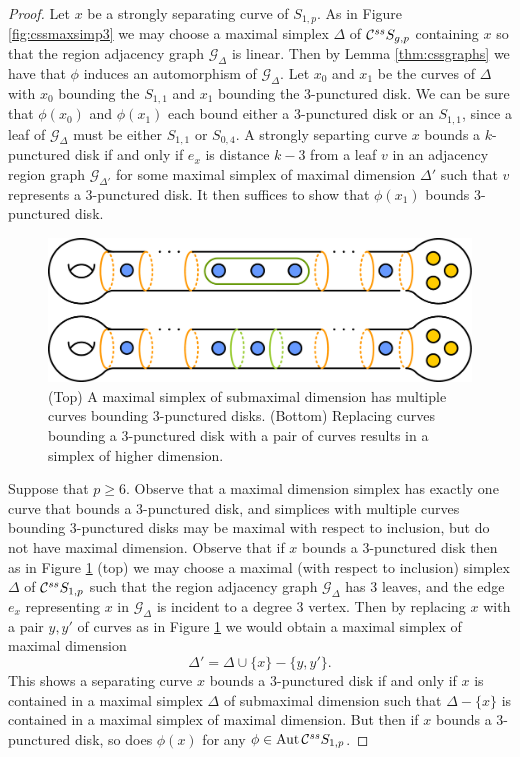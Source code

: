 \begin{proof}
    Let $x$ be a strongly separating curve of $S_{1,p}$.
    As in Figure \ref{fig:cssmaxsimp3} we may choose a maximal simplex $\Delta$ of $ \mathcal C^{{ss}}  S_{g,p}$
    containing $x$ so that the region adjacency graph $\mathcal G_\Delta$ is linear.
    Then by Lemma \ref{thm:cssgraphs} we have that $\phi$ induces an automorphism of $\mathcal G_\Delta$.
    Let $x_0$ and $x_1$ be the curves of $\Delta$ with $x_0$ bounding the $S_{1,1}$ and
    $x_1$ bounding the 3-punctured disk. We can be sure that $\phi(x_0)$ and $\phi(x_1)$ each
    bound either a 3-punctured disk or an $S_{1,1}$, since a leaf of $\mathcal G_\Delta$ must be either $S_{1,1}$ or $S_{0,4}$.
    A strongly separting curve  $x$ bounds a $k$-punctured disk if and only if $e_x$ is distance $k-3$ from a leaf $v$ in an adjacency region graph $\mathcal G_{\Delta'}$ for some maximal simplex of maximal dimension $\Delta'$ such that $v$ represents a 3-punctured disk.
    It then suffices to show that $\phi(x_1)$ bounds 3-punctured disk.

    \begin{figure}[h!]
      \centering
      \includegraphics[width=.6\textwidth]{figures/cssmaxsimp5.pdf}
      \caption{(Top) A maximal simplex of submaximal dimension has multiple curves bounding 3-punctured disks.
      (Bottom) Replacing curves bounding a 3-punctured disk with a pair of curves results in a simplex of higher dimension.}
      \label{fig:cssmaxsimp5}
    \end{figure}

    Suppose that $p\geq 6$. Observe that a maximal dimension simplex has exactly one curve that bounds
    a 3-punctured disk, and simplices with multiple curves bounding 3-punctured disks may be maximal with respect to inclusion, but do not have maximal dimension.
    Observe that if $x$ bounds a 3-punctured disk then
    as in Figure \ref{fig:cssmaxsimp5} (top) we may choose a maximal (with respect to inclusion)
    simplex $\Delta$ of $ \mathcal C^{{ss}}  S_{1,p}$ such that the region adjacency graph $\mathcal G_{\Delta}$ has 3 leaves,
    and
    the edge $e_x$ representing $x$ in $\mathcal G_{\Delta}$ is incident to a degree 3 vertex.
    Then by replacing $x$ with a pair $y,y'$ of curves as in Figure \ref{fig:cssmaxsimp5}
    we would obtain a maximal simplex of maximal dimension
    $$\Delta' = \Delta \cup \{x\} -\{y,y'\}.$$
    This shows a separating curve $x$ bounds a 3-punctured disk if and only if
    $x$ is contained in a maximal simplex $\Delta$ of submaximal dimension such
    that $\Delta-\{x\}$ is contained in a maximal simplex of maximal dimension.
    But then if $x$ bounds a 3-punctured disk, so does $\phi(x)$ for any $\phi \in \operatorname{Aut}  \mathcal C^{{ss}}  S_{1,p}$.





\end{proof}
